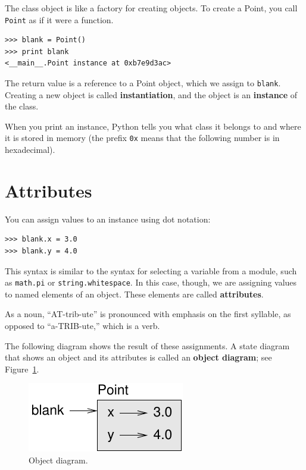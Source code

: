 \documentclass[12pt,a4paper,final,twoside,onecolumn,titlepage]{book}
\begin{document}
The class object is like a factory for creating objects.  To create a
Point, you call {\tt Point} as if it were a function.

\begin{verbatim}
>>> blank = Point()
>>> print blank
<__main__.Point instance at 0xb7e9d3ac>
\end{verbatim}
%
The return value is a reference to a Point object, which we
assign to {\tt blank}.  
Creating a new object is called
{\bf instantiation}, and the object is an {\bf instance} of
the class.

When you print an instance, Python tells you what class it
belongs to and where it is stored in memory (the prefix
{\tt 0x} means that the following number is in hexadecimal).


\section{Attributes}
\label{attributes}

You can assign values to an instance using dot notation:

\begin{verbatim}
>>> blank.x = 3.0
>>> blank.y = 4.0
\end{verbatim}
%
This syntax is similar to the syntax for selecting a variable from a
module, such as {\tt math.pi} or {\tt string.whitespace}.  In this case,
though, we are assigning values to named elements of an object.
These elements are called {\bf attributes}.

As a noun, ``AT-trib-ute'' is pronounced with emphasis on the first
syllable, as opposed to ``a-TRIB-ute,'' which is a verb.

The following diagram shows the result of these assignments.
A state diagram that shows an object and its attributes is
called an {\bf object diagram}; see Figure~\ref{fig.point}.

\begin{figure}
\centerline
{\includegraphics[scale=0.8]{figs/point.pdf}}
\caption{Object diagram.}
\label{fig.point}
\end{figure}
\end{document}
